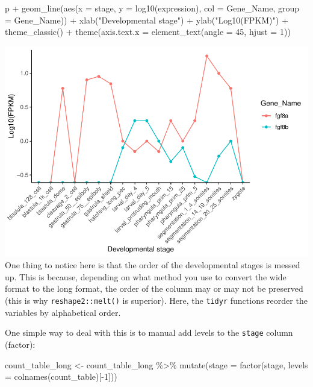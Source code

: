 \documentclass[
]{article}
\newenvironment{Shaded}{\begin{snugshade}}{\end{snugshade}}
\newcommand{\AttributeTok}[1]{\textcolor[rgb]{0.77,0.63,0.00}{#1}}
\newcommand{\DecValTok}[1]{\textcolor[rgb]{0.00,0.00,0.81}{#1}}
\newcommand{\FunctionTok}[1]{\textcolor[rgb]{0.00,0.00,0.00}{#1}}
\newcommand{\NormalTok}[1]{#1}
\newcommand{\OtherTok}[1]{\textcolor[rgb]{0.56,0.35,0.01}{#1}}
\newcommand{\SpecialCharTok}[1]{\textcolor[rgb]{0.00,0.00,0.00}{#1}}
\newcommand{\StringTok}[1]{\textcolor[rgb]{0.31,0.60,0.02}{#1}}
\begin{document}
\begin{Shaded}
\begin{Highlighting}[]
\NormalTok{p }\SpecialCharTok{+}
  \FunctionTok{geom\_line}\NormalTok{(}\FunctionTok{aes}\NormalTok{(}\AttributeTok{x =}\NormalTok{ stage, }\AttributeTok{y =} \FunctionTok{log10}\NormalTok{(expression), }\AttributeTok{col =}\NormalTok{ Gene\_Name, }\AttributeTok{group =}\NormalTok{ Gene\_Name)) }\SpecialCharTok{+}
  \FunctionTok{xlab}\NormalTok{(}\StringTok{"Developmental stage"}\NormalTok{) }\SpecialCharTok{+}
  \FunctionTok{ylab}\NormalTok{(}\StringTok{"Log10(FPKM)"}\NormalTok{) }\SpecialCharTok{+}
  \FunctionTok{theme\_classic}\NormalTok{() }\SpecialCharTok{+}
  \FunctionTok{theme}\NormalTok{(}\AttributeTok{axis.text.x =} \FunctionTok{element\_text}\NormalTok{(}\AttributeTok{angle =} \DecValTok{45}\NormalTok{, }\AttributeTok{hjust =} \DecValTok{1}\NormalTok{))}
\end{Highlighting}
\end{Shaded}

\includegraphics{1_R_basics_and_tidyverse_files/figure-latex/unnamed-chunk-21-1.pdf}
One thing to notice here is that the order of the developmental stages
is messed up. This is because, depending on what method you use to
convert the wide format to the long format, the order of the column may
or may not be preserved (this is why \texttt{reshape2::melt()} is
superior). Here, the \texttt{tidyr} functions reorder the variables by
alphabetical order.

One simple way to deal with this is to manual add levels to the
\texttt{stage} column (factor):

\begin{Shaded}
\begin{Highlighting}[]
\NormalTok{count\_table\_long }\OtherTok{\textless{}{-}}\NormalTok{ count\_table\_long }\SpecialCharTok{\%\textgreater{}\%} 
  \FunctionTok{mutate}\NormalTok{(}\AttributeTok{stage =} \FunctionTok{factor}\NormalTok{(stage, }\AttributeTok{levels =} \FunctionTok{colnames}\NormalTok{(count\_table)[}\SpecialCharTok{{-}}\DecValTok{1}\NormalTok{]))}
\end{Highlighting}
\end{Shaded}
\end{document}
